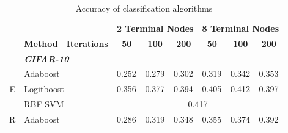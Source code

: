 \documentclass[12pt]{article}
\begin{document}
\begin{sloppypar}
\begin{table}
\centering
\caption{Accuracy of classification algorithms}
\label{tab:result-table}
\begin{tabular}{lllllllll}
\hline
                                       & \textbf{}       & \multicolumn{1}{c}{\textbf{}}           & \multicolumn{3}{c}{\textbf{2 Terminal Nodes}}                                                         & \multicolumn{3}{c}{\textbf{8 Terminal Nodes}}                                                         \\
                                       & \textbf{Method} & \multicolumn{1}{c}{\textbf{Iterations}} & \multicolumn{1}{c}{\textbf{50}} & \multicolumn{1}{c}{\textbf{100}} & \multicolumn{1}{c}{\textbf{200}} & \multicolumn{1}{c}{\textbf{50}} & \multicolumn{1}{c}{\textbf{100}} & \multicolumn{1}{c}{\textbf{200}} \\ \hline
                                       & \multicolumn{2}{l}{\textit{\textbf{CIFAR-10}}}            &                                 &                                  &                                  &                                 &                                  &                                  \\
\multicolumn{1}{c}{\multirow{3}{*}{E}} & \multicolumn{2}{l}{Adaboost}                              & 0.252                           & 0.279                            & 0.302                            & 0.319                           & 0.342                            & 0.353                            \\
\multicolumn{1}{c}{}                   & \multicolumn{2}{l}{Logitboost}                            & 0.356                           & 0.377                            & 0.394                            & 0.405                           & 0.412                            & 0.397                            \\
\multicolumn{1}{c}{}                   & \multicolumn{2}{l}{RBF SVM}                               & \multicolumn{6}{c}{0.417}                                                                                                                                                                                     \\
\multirow{3}{*}{R}                     & \multicolumn{2}{l}{Adaboost}                              & 0.286                           & 0.319                            & 0.348                            & 0.355                           & 0.374                            & 0.392                            \\

\end{tabular}
\end{table}
\end{sloppypar}
\end{document}
